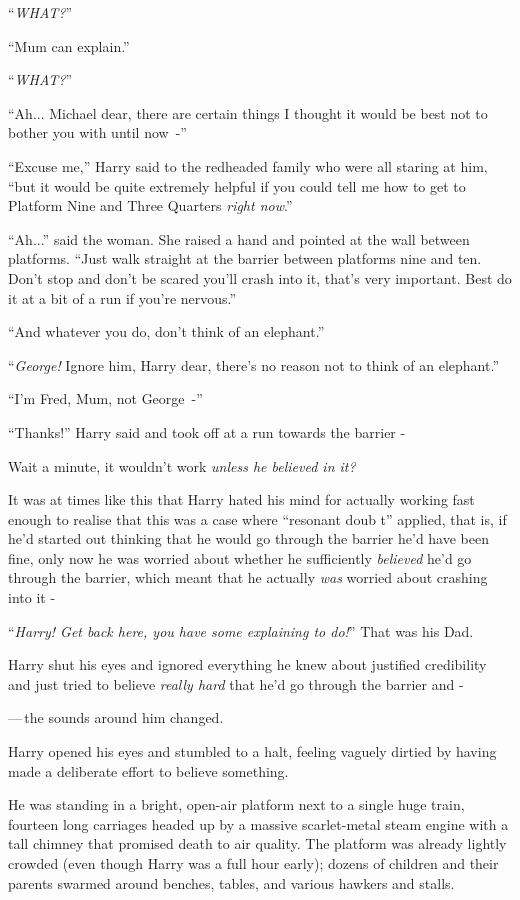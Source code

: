 ``\emph{WHAT?}''

``Mum can explain.''

``\emph{WHAT?}''

``Ah... Michael dear, there are certain things I thought it would be best not to bother you with until now~-''

``Excuse me,'' Harry said to the redheaded family who were all staring at him, ``but it would be quite extremely helpful if you could tell me how to get to Platform Nine and Three Quarters \emph{right now}.''

``Ah...'' said the woman. She raised a hand and pointed at the wall between platforms. ``Just walk straight at the barrier between platforms nine and ten. Don't stop and don't be scared you'll crash into it, that's very important. Best do it at a bit of a run if you're nervous.''

``And whatever you do, don't think of an elephant.''

``\emph{George!} Ignore him, Harry dear, there's no reason not to think of an elephant.''

``I'm Fred, Mum, not George~-''

``Thanks!'' Harry said and took off at a run towards the barrier -

Wait a minute, it wouldn't work \emph{unless he believed in it?}

It was at times like this that Harry hated his mind for actually working fast enough to realise that this was a case where ``resonant doub t'' applied, that is, if he'd started out thinking that he would go through the barrier he'd have been fine, only now he was worried about whether he sufficiently \emph{believed} he'd go through the barrier, which meant that he actually \emph{was} worried about crashing into it -

``\emph{Harry! Get back here, you have some explaining to do!}'' That was his Dad.

Harry shut his eyes and ignored everything he knew about justified credibility and just tried to believe \emph{really hard} that he'd go through the barrier and -

---\,the sounds around him changed.

Harry opened his eyes and stumbled to a halt, feeling vaguely dirtied by having made a deliberate effort to believe something.

He was standing in a bright, open-air platform next to a single huge train, fourteen long carriages headed up by a massive scarlet-metal steam engine with a tall chimney that promised death to air quality. The platform was already lightly crowded (even though Harry was a full hour early); dozens of children and their parents swarmed around benches, tables, and various hawkers and stalls.


